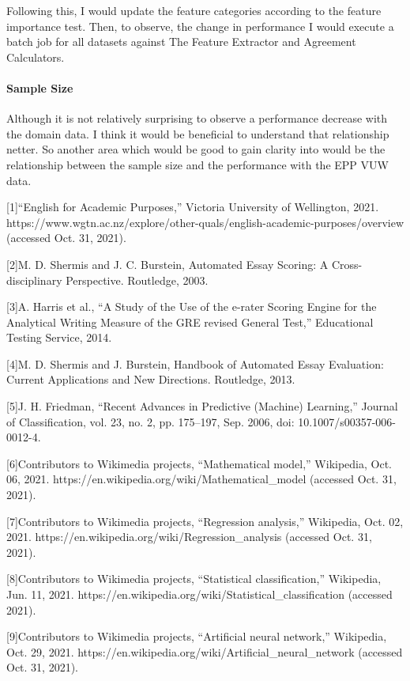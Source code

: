 Following this, I would update the feature categories according to the feature importance test. Then, to observe, the change in performance I would execute a batch job for all datasets against The Feature Extractor and Agreement Calculators.

\paragraph{Sample Size}

Although it is not relatively surprising to observe a performance decrease with the domain data. I think it would be beneficial to understand that relationship netter. So another area which would be good to gain clarity into would be the relationship between the sample size and the performance with the EPP VUW data. 

\backmatter

    [1]“English for Academic Purposes,” Victoria University of Wellington, 2021. https://www.wgtn.ac.nz/explore/other-quals/english-academic-purposes/overview (accessed Oct. 31, 2021).
  

    [2]M. D. Shermis and J. C. Burstein, Automated Essay Scoring: A Cross-disciplinary Perspective. Routledge, 2003.
  

    [3]A. Harris et al., “A Study of the Use of the e-rater Scoring Engine for the Analytical Writing Measure of the GRE revised General Test,” Educational Testing Service, 2014.
  

    [4]M. D. Shermis and J. Burstein, Handbook of Automated Essay Evaluation: Current Applications and New Directions. Routledge, 2013.
  

    [5]J. H. Friedman, “Recent Advances in Predictive (Machine) Learning,” Journal of Classification, vol. 23, no. 2, pp. 175–197, Sep. 2006, doi: 10.1007/s00357-006-0012-4.
  

    [6]Contributors to Wikimedia projects, “Mathematical model,” Wikipedia, Oct. 06, 2021. https://en.wikipedia.org/wiki/Mathematical_model (accessed Oct. 31, 2021).
  

    [7]Contributors to Wikimedia projects, “Regression analysis,” Wikipedia, Oct. 02, 2021. https://en.wikipedia.org/wiki/Regression_analysis (accessed Oct. 31, 2021).
  

    [8]Contributors to Wikimedia projects, “Statistical classification,” Wikipedia, Jun. 11, 2021. https://en.wikipedia.org/wiki/Statistical_classification (accessed 2021).
  

    [9]Contributors to Wikimedia projects, “Artificial neural network,” Wikipedia, Oct. 29, 2021. https://en.wikipedia.org/wiki/Artificial_neural_network (accessed Oct. 31, 2021).
  

